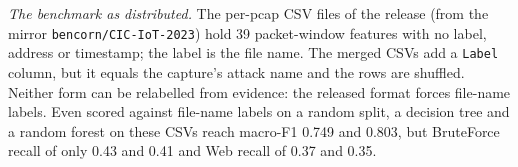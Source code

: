 \emph{The benchmark as distributed.} The per-pcap CSV files of the release (from the mirror \texttt{bencorn/CIC-IoT-2023}) hold 39 packet-window features with no label, address or timestamp; the label is the file name. The merged CSVs add a \texttt{Label} column, but it equals the capture's attack name and the rows are shuffled. Neither form can be relabelled from evidence: the released format forces file-name labels. Even scored against file-name labels on a random split, a decision tree and a random forest on these CSVs reach macro-F1 0.749 and 0.803, but BruteForce recall of only 0.43 and 0.41 and Web recall of 0.37 and 0.35.
